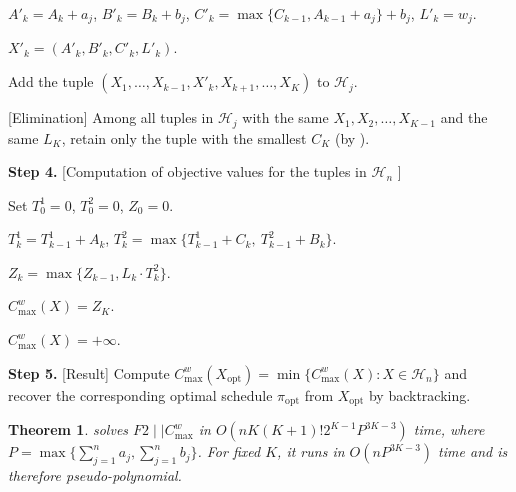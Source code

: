 ﻿\documentclass[12pt]{article} \textheight=24.5cm \textwidth=16.5cm \parskip = 0.165cm
\newtheorem{theorem}{Theorem}[section]
\begin{document}
\begin{sloppypar}
\begin{algorithm}[H]
            {
                {
                    {
                        $A'_k = A_k+a_j$, $B'_k = B_k+b_j$, $C'_k = \max\{C_{k-1}, A_{k-1}+a_j\}+b_j$, $L'_k= w_j$. \;

                        $X'_k=(A'_k, B'_k, C'_k, L'_k)$. \;

                        Add the tuple $(X_1, \ldots, X_{k-1}, X'_k, X_{k+1}, \ldots, X_K)$ to $\mathcal{H}_j$. \;
                    }
                }
                [Elimination] Among all tuples in $\mathcal{H}_j$ with the same $X_1, X_2, \ldots, X_{K-1}$ and the same $L_K$, retain only the tuple with the smallest $C_K$ (by ). \;
            }

            \textbf{Step 4.} [Computation of objective values for the tuples in $\mathcal{H}_n$ ]

            {
                {
                    Set $T_0^1= 0$, $T_0^2=0$, $Z_0=0$. \;

                    {
                        $T_k^1= T_{k-1}^1+A_k$, $T_k^2 = \max\{T_{k-1}^1+C_k,\ T_{k-1}^2+B_k\}$. \;

                        $Z_k = \max \{Z_{k-1}, L_k \cdot T_k^2\}$. \;
                    }

                    $C_{\max}^w(X)=Z_K$. \;
                }{
                    $C_{\max}^w(X)=+\infty$. \;
                }
            }
            \textbf{Step 5.} [Result] Compute $C_{\max}^w(X_{\mathrm{opt}})=\min \{C_{\max}^w(X): X \in \mathcal{H}_n\}$ and recover the corresponding optimal schedule $\pi_{\mathrm{opt}}$ from $X_{\mathrm{opt}}$ by backtracking. \;

        \end{algorithm}


        \begin{theorem}\label{thm:complexity}
         solves $F2 \mid \mid C_{\max}^w$ in $O(n K (K+1)! 2^{K-1} P^{3K-3})$ time, where $P = \max \{\sum_{j=1}^{n}a_j, \sum_{j=1}^{n}b_j\}$.
        For fixed $K$, it runs in $O(nP^{3K-3})$ time and is therefore pseudo-polynomial.
        \end{theorem}


\end{sloppypar}
\end{document}
